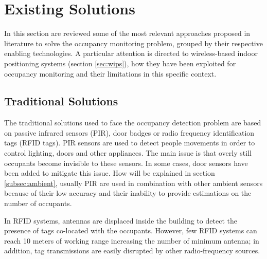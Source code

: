 
\section{Existing Solutions}
\label{sec:soa}
In this section are reviewed some of the most relevant approaches proposed in literature to solve the occupancy monitoring problem, grouped by their respective enabling technologies. A particular attention is directed to wireless-based indoor positioning systems (section \ref{sec:wips}), how they have been exploited for occupancy monitoring and their limitations in this specific context.

\subsection{Traditional Solutions}
The traditional solutions used to face the occupancy detection problem are based on passive infrared sensors (PIR), door badges or radio frequency identification tags (RFID tags). PIR sensors are used to detect people movements in order to control lighting, doors and other appliances.
The main issue is that overly still occupants become invisible to these sensors. In some cases, door sensors have been added to mitigate this issue. How will be explained in section \ref{subsec:ambient}, usually PIR are used in combination with other ambient sensors because of their low accuracy and their inability to provide estimations on the number of occupants.

In RFID systems, antennas are displaced inside the building to detect the presence of tags co-located with the occupants. However, few RFID systems can reach 10 meters of working range increasing the number of minimum antenna; in addition, tag transmissions are easily disrupted by other radio-frequency sources.

